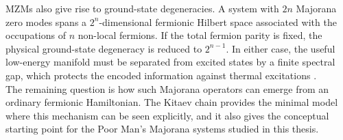 MZMs also give rise to ground-state degeneracies. A system with $2n$ Majorana zero modes spans a $2^n$-dimensional fermionic Hilbert space associated with the occupations of $n$ non-local fermions. If the total fermion parity is fixed, the physical ground-state degeneracy is reduced to $2^{n-1}$. In either case, the useful low-energy manifold must be separated from excited states by a finite spectral gap, which protects the encoded information against thermal excitations \cite{kitaevUnpairedMajoranaFermions2001}.\\
The remaining question is how such Majorana operators can emerge from an ordinary fermionic Hamiltonian. The Kitaev chain provides the minimal model where this mechanism can be seen explicitly, and it also gives the conceptual starting point for the Poor Man's Majorana systems studied in this thesis.





